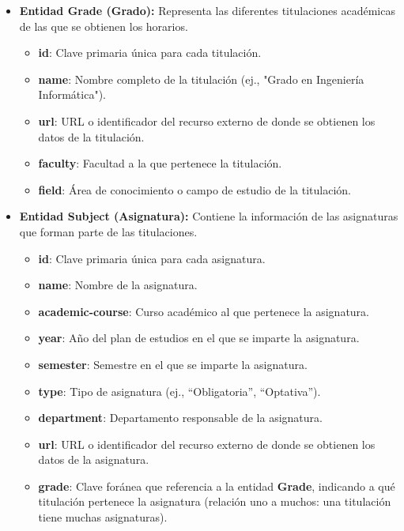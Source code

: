 \begin{itemize}
    \item \textbf{Entidad Grade (Grado):}
    Representa las diferentes titulaciones académicas de las que se obtienen los horarios.
    \begin{itemize}
        \item \textbf{id}: Clave primaria única para cada titulación.
        \item \textbf{name}: Nombre completo de la titulación (ej., "Grado en Ingeniería Informática").
        \item \textbf{url}: URL o identificador del recurso externo de donde se obtienen los datos de la titulación.
        \item \textbf{faculty}: Facultad a la que pertenece la titulación.
        \item \textbf{field}: Área de conocimiento o campo de estudio de la titulación.
    \end{itemize}

    \item \textbf{Entidad Subject (Asignatura):}
    Contiene la información de las asignaturas que forman parte de las titulaciones.
    \begin{itemize}
        \item \textbf{id}: Clave primaria única para cada asignatura.
        \item \textbf{name}: Nombre de la asignatura.
        \item \textbf{academic-course}: Curso académico al que pertenece la asignatura.
        \item \textbf{year}: Año del plan de estudios en el que se imparte la asignatura.
        \item \textbf{semester}: Semestre en el que se imparte la asignatura.
        \item \textbf{type}: Tipo de asignatura (ej., ``Obligatoria'', ``Optativa'').
        \item \textbf{department}: Departamento responsable de la asignatura.
        \item \textbf{url}: URL o identificador del recurso externo de donde se obtienen los datos de la asignatura.
        \item \textbf{grade}: Clave foránea que referencia a la entidad \textbf{Grade}, indicando a qué titulación pertenece la asignatura (relación uno a muchos: una titulación tiene muchas asignaturas).
    \end{itemize}


\end{itemize}
